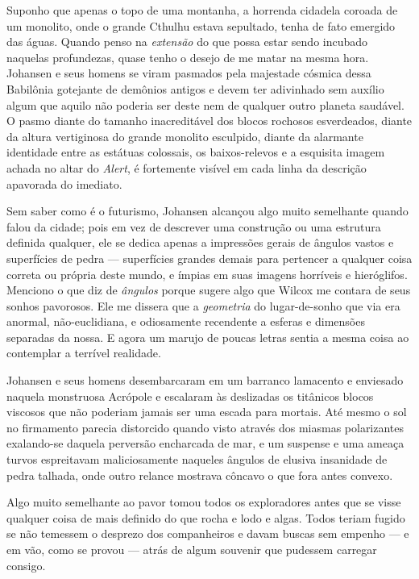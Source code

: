 Suponho que apenas o topo de uma montanha, a horrenda cidadela coroada
de um monolito, onde o grande Cthulhu estava sepultado, tenha de fato
emergido das águas. Quando penso na \emph{extensão} do que possa estar
sendo incubado naquelas profundezas, quase tenho o desejo de me matar na
mesma hora. Johansen e seus homens se viram pasmados pela majestade
cósmica dessa Babilônia gotejante de demônios antigos e devem ter
adivinhado sem auxílio algum que aquilo não poderia ser deste nem de
qualquer outro planeta saudável. O pasmo diante do tamanho inacreditável
dos blocos rochosos esverdeados, diante da altura vertiginosa do grande
monolito esculpido, diante da alarmante identidade entre as estátuas
colossais, os baixos-relevos e a esquisita imagem achada no altar do
\emph{Alert}, é fortemente visível em cada linha da descrição apavorada
do imediato.

Sem saber como é o futurismo, Johansen alcançou algo muito semelhante
quando falou da cidade; pois em vez de descrever uma construção ou uma
estrutura definida qualquer, ele se dedica apenas a impressões gerais de
ângulos vastos e superfícies de pedra --- superfícies grandes demais
para pertencer a qualquer coisa correta ou própria deste mundo, e ímpias
em suas imagens horríveis e hieróglifos. Menciono o que diz de
\emph{ângulos} porque sugere algo que Wilcox me contara de seus sonhos
pavorosos. Ele me dissera que a \emph{geometria} do lugar-de-sonho que
via era anormal, não-euclidiana, e odiosamente recendente a esferas e
dimensões separadas da nossa. E agora um marujo de poucas letras sentia
a mesma coisa ao contemplar a terrível realidade.

Johansen e seus homens desembarcaram em um barranco lamacento e
enviesado naquela monstruosa Acrópole e escalaram às deslizadas os
titânicos blocos viscosos que não poderiam jamais ser uma escada para
mortais. Até mesmo o sol no firmamento parecia distorcido quando visto
através dos miasmas polarizantes exalando-se daquela perversão
encharcada de mar, e um suspense e uma ameaça turvos espreitavam
maliciosamente naqueles ângulos de elusiva insanidade de pedra talhada,
onde outro relance mostrava côncavo o que fora antes convexo.

Algo muito semelhante ao pavor tomou todos os exploradores antes que se
visse qualquer coisa de mais definido do que rocha e lodo e algas. Todos
teriam fugido se não temessem o desprezo dos companheiros e davam
buscas sem empenho --- e em vão, como se provou --- atrás de algum souvenir que pudessem carregar consigo.

